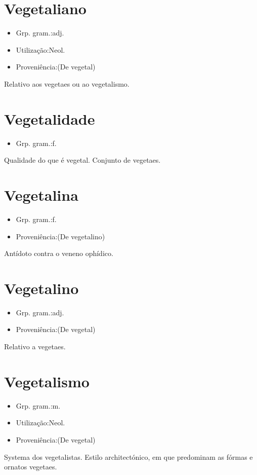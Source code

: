 \documentclass{article}
\begin{document}
\section{Vegetaliano}
\begin{itemize}
\item {Grp. gram.:adj.}
\end{itemize}
\begin{itemize}
\item {Utilização:Neol.}
\end{itemize}
\begin{itemize}
\item {Proveniência:(De \textunderscore vegetal\textunderscore )}
\end{itemize}
Relativo aos vegetaes ou ao vegetalismo.
\section{Vegetalidade}
\begin{itemize}
\item {Grp. gram.:f.}
\end{itemize}
Qualidade do que é vegetal.
Conjunto de vegetaes.
\section{Vegetalina}
\begin{itemize}
\item {Grp. gram.:f.}
\end{itemize}
\begin{itemize}
\item {Proveniência:(De \textunderscore vegetalino\textunderscore )}
\end{itemize}
Antídoto contra o veneno ophídico.
\section{Vegetalino}
\begin{itemize}
\item {Grp. gram.:adj.}
\end{itemize}
\begin{itemize}
\item {Proveniência:(De \textunderscore vegetal\textunderscore )}
\end{itemize}
Relativo a vegetaes.
\section{Vegetalismo}
\begin{itemize}
\item {Grp. gram.:m.}
\end{itemize}
\begin{itemize}
\item {Utilização:Neol.}
\end{itemize}
\begin{itemize}
\item {Proveniência:(De \textunderscore vegetal\textunderscore )}
\end{itemize}
Systema dos vegetalistas.
Estilo architectónico, em que predominam as fórmas e ornatos vegetaes.
\end{document}
